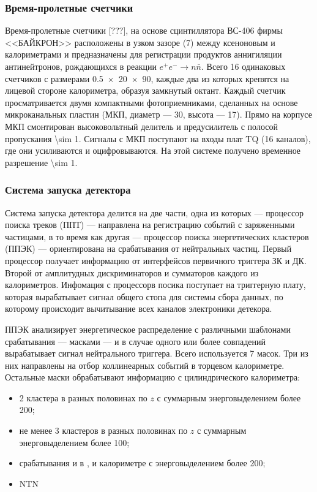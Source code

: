\subsubsection{Время-пролетные счетчики}
\label{sec:tof}

Время-пролетные счетчики [???], на основе сцинтиллятора ВС-406 фирмы <<БАЙКРОН>> расположены в
узком зазоре (\SI{7}{\mmr}) между ксеноновым и  калориметрами и предназначены для регистрации продуктов
аннигиляции антинейтронов, рождающихся в реакции $e^+e^- \to n \bar{n}$. 
Всего \num{16} одинаковых счетчиков с размерами \SI[product-units = power]{0.5 x 20 x 90}{\cmr},
каждые два из которых крепятся на лицевой стороне  калориметра,
образуя замкнутый октант.
Каждый счетчик просматривается двумя компактными фотоприемниками,
сделанных на основе микроканальных пластин
(МКП, диаметр --- \SI{30}{\mmr}, высота --- \SI{17}{\mmr}). 
Прямо на корпусе МКП смонтирован высоковольтный делитель и предусилитель с полосой пропускания \SI{\sim 1}{\GHzr}. 
Сигналы с МКП поступают на входы плат TQ (\num{16} каналов),
где они усиливаются и оцифровываются. 
На этой системе получено временное разрешение \SI{\sim 1}{\nsr}.




\subsubsection{Система запуска детектора}
\label{sec:trigger}

Система запуска детектора делится на две части,
одна из которых --- процессор поиска треков (ППТ) --- направлена на регистрацию событий с заряженными частицами,
в то время как другая --- процессор поиска энергетических кластеров (ППЭК) --- ориентирована на срабатывания от нейтральных частиц.
Первый процессор получает информацию от интерфейсов первичного триггера ЗК и ДК.
Второй от амплитудных дискриминаторов и сумматоров каждого из калориметров.
Инфомация с процессорв посика поступает на триггерную плату,
которая вырабатывает сигнал общего стопа для системы сбора данных,
по которому происходит вычитывание всех каналов электроники детекора.

ППЭК анализирует энергетическое распределение с различными шаблонами срабатывания --- масками ---
и в случае одного или более совпадений вырабатывает сигнал нейтрального триггера.
Всего используется 7 масок.
Три из них направлены на отбор коллинеарных событий в торцевом калориметре.
Остальные маски обрабатывают информацию с цилиндрического калориметра:
\begin{itemize}
    \item 2 кластера в разных половинах по $z$ с суммарным энерговыделением более \SI{200}{\MeVr};
    \item не менее 3 кластеров в разных половинах по $z$ с суммарным энерговыделением более \SI{100}{\MeVr};
    \item срабатывания и в , и  калориметре с энерговыделением более \SI{200}{\MeVr};
    \item NTN
\end{itemize}







